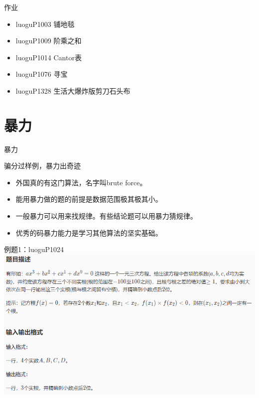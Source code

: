 \documentclass{beamer}[UTF-8]
\begin{document}
\begin{frame}{作业}
 \pause
\begin{itemize}
\item luoguP1003 铺地毯
\item luoguP1009 阶乘之和
\item luoguP1014 Cantor表
\item luoguP1076 寻宝
\item luoguP1328 生活大爆炸版剪刀石头布
\end{itemize}

\end{frame}

\section{暴力} %
\begin{frame}{暴力}
\begin{center} 骗分过样例，暴力出奇迹 \end{center} \pause
\begin{itemize}
\item 外国真的有这门算法，名字叫brute force。 \pause
\item 能用暴力做的题的前提是数据范围极其极其小。 \pause
\item 一般暴力可以用来找规律。有些结论题可以用暴力猜规律。 \pause
\item 优秀的码暴力能力是学习其他算法的坚实基础。
\end{itemize}
\end{frame}

\begin{frame}{例题1：luoguP1024}
\includegraphics{luoguP1024.png}
\end{frame}
\end{document}
